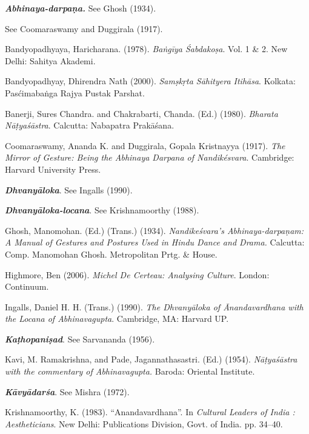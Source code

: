 \begin{thebibliography}{99}
\itemsep=2pt
{\sl\bfseries Abhinaya-darpaṇa.} See Ghosh (1934).

See Coomaraswamy and Duggirala (1917).

Bandyopadhyaya, Haricharana. (1978). \textsl{Baṅgīya Śabdakoṣa}. Vol. 1 \& 2. New Delhi: Sahitya Akademi. 

Bandyopadhyay, Dhirendra Nath (2000). \textsl{Samṣkṛta Sāhityera Itihāsa}. Kolkata: Pasćimabaṅga Rajya Pustak Parshat. 

Banerji, Sures Chandra. and Chakrabarti, Chanda. (Ed.) (1980). \textsl{Bharata Nāṭyaśāstra}. Calcutta: Nabapatra Prakāśana.

Coomaraswamy, Ananda K. and Duggirala, Gopala Kristnayya (1917). \textsl{The Mirror of Gesture: Being the Abhinaya Darpana of Nandikésvara}. Cambridge: Harvard University Press. 

{\sl\bfseries Dhvanyāloka}. See Ingalls (1990).

{\sl\bfseries Dhvanyāloka-locana}. See Krishnamoorthy (1988).

Ghosh, Manomohan. (Ed.) (Trans.) (1934). \textsl{Nandikeśvara's Abhinaya-darpaṇam: A Manual of Gestures and Postures Used in Hindu Dance and Drama.} Calcutta: Comp. Manomohan Ghosh. Metropolitan Prtg. \& House. 

Highmore, Ben (2006). \textsl{Michel De Certeau: Analysing Culture}. London: Continuum.

Ingalls, Daniel H. H. (Trans.) (1990). \textsl{The Dhvanyāloka of Ānandavardhana with the Locana of Abhinavagupta}. Cambridge, MA: Harvard UP.

{\sl\bfseries Kaṭhopaniṣad}. See Sarvananda (1956).

Kavi, M. Ramakrishna, and Pade, Jagannathasastri. (Ed.) (1954). \textsl{Nāṭyaśāstra with the commentary of Abhinavagupta.} Baroda: Oriental Institute. 

{\sl\bfseries Kāvyādarśa}. See Mishra (1972).

Krishnamoorthy, K. (1983). “Anandavardhana”. In {\sl Cultural Leaders of India : Aestheticians}. New Delhi: Publications Division, Govt. of India. pp. 34--40.


\end{thebibliography}
